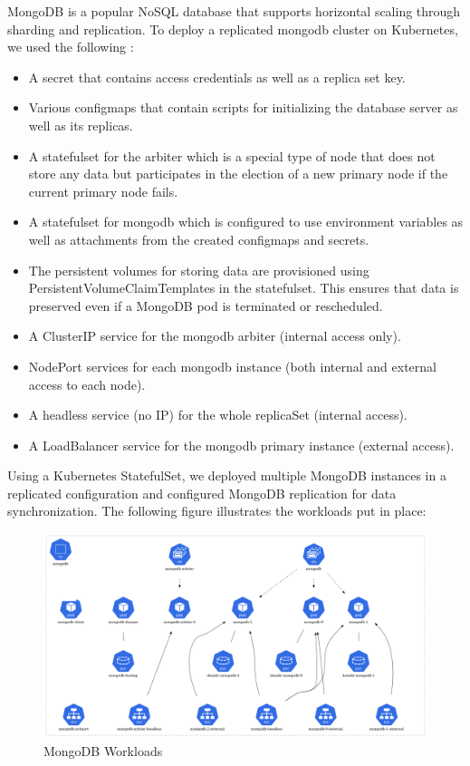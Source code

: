 MongoDB is a popular NoSQL database that supports horizontal scaling through sharding and replication. To deploy a replicated mongodb cluster on Kubernetes, we used the following : 
\begin{itemize}[label={--}]
\item A secret that contains access credentials as well as a replica set key. 
\item Various configmaps that contain scripts for initializing the database server as well as its replicas. 
\item A statefulset for the arbiter which is a special type of node that does not store any data but participates in the election of a new primary node if the current primary node fails. 
\item A statefulset for mongodb which is configured to use environment variables as well as attachments from the created configmaps and secrets. 
\item The persistent volumes for storing data are provisioned using PersistentVolumeClaimTemplates in the statefulset. This ensures that data is preserved even if a MongoDB pod is terminated or rescheduled. 
\item A ClusterIP service for the mongodb arbiter (internal access only). 
\item NodePort services for each mongodb instance (both internal and external access to each node). 
\item A headless service (no IP) for the whole replicaSet (internal access). 
\item A LoadBalancer service for the mongodb primary instance (external access). 
\end{itemize}

Using a Kubernetes StatefulSet, we deployed multiple MongoDB instances in a replicated configuration and configured MongoDB replication for data synchronization. The following figure illustrates the workloads put in place: 


\begin{figure}[H]\centering
\includegraphics[width=1.0\textwidth,angle=00]{assets/f36.png}
\caption{MongoDB Workloads }
\label{fig:MongoDB Workloads}
\end{figure}

